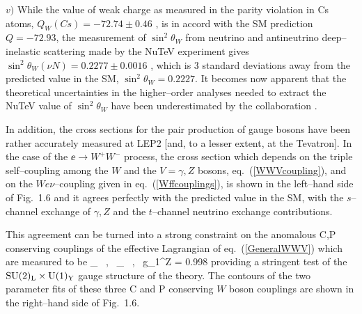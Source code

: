 $v)$ While the value of weak charge as measured in the parity violation in Cs 
atoms, $Q_W (Cs)=-72.74 \pm 0.46$ \cite{Q-APV}, is in accord with the SM 
prediction $Q=-72.93$, the measurement of $\sin^2\theta_W$ from neutrino and 
antineutrino deep--inelastic scattering made by the NuTeV experiment gives 
$\sin^2\theta_W (\nu N) = 0.2277  \pm 0.0016$ \cite{NuTeV}, which is 3 standard 
deviations away from the predicted value in the SM, $\sin^2\theta_W=0.2227$. 
It becomes now apparent that the theoretical uncertainties in the higher--order 
analyses needed to extract the NuTeV value of $\sin^2\theta_W$ have been 
underestimated by the collaboration \cite{Paolo-NuTeV,NuTeV-new}. \s

In addition, the cross sections for the pair production of gauge bosons have
been rather accurately measured at LEP2 [and, to a lesser extent, at the
Tevatron]. In the case of the $\ee \to W^+ W^-$ process, the cross section
which depends on the triple self--coupling among the $W$ and the $V=\gamma,Z$
bosons, eq.~(\ref{WWVcoupling}), and on the $We\nu$--coupling given in
eq.~(\ref{Wffcouplings}), is shown in the left--hand side of Fig.~1.6 and it
agrees perfectly with the predicted value in the SM, with the $s$--channel
exchange of $\gamma,Z$ and the $t$--channel neutrino exchange contributions.\s 

This agreement can be turned into a strong constraint on the anomalous C,P 
conserving couplings of the effective Lagrangian of eq.~(\ref{GeneralWWV}) 
which are measured to be \cite{MW-LEP2}
\beq
\kappa_  \, , \  
\lambda_  \, , \
g_1^Z = 0.998 
\eeq
providing a stringent test of the ${\rm SU(2)_L\times U(1)_Y}$ gauge structure 
of the theory. The contours of the two parameter fits of these three C and P
conserving $W$ boson couplings are shown in the right--hand side of Fig.~1.6.\s

